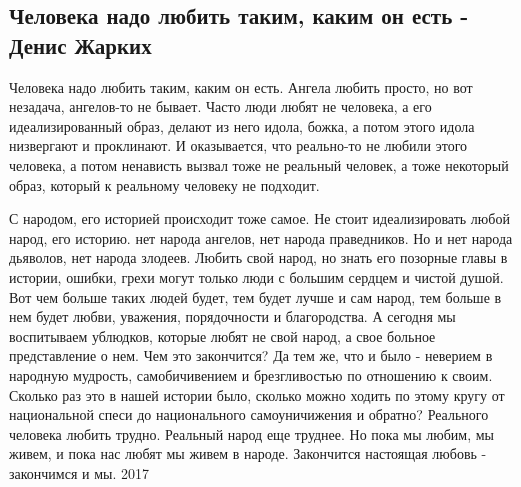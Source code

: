  
 
 

\subsection{Человека надо любить таким, каким он есть - Денис Жарких}
\label{sec:30_10_2020.fb.denis_zharkih.1.human}


Человека надо любить таким, каким он есть. Ангела любить просто, но вот
незадача, ангелов-то не бывает. Часто люди любят не человека, а его
идеализированный образ, делают из него идола, божка, а потом этого идола
низвергают и проклинают. И оказывается, что реально-то не любили этого
человека, а потом ненависть вызвал тоже не реальный человек, а тоже некоторый
образ, который к реальному человеку не подходит.

С народом, его историей происходит тоже самое. Не стоит идеализировать любой
народ, его историю. нет народа ангелов, нет народа праведников. Но и нет народа
дьяволов, нет народа злодеев. Любить свой народ, но знать его позорные главы в
истории, ошибки, грехи могут только люди с большим сердцем и чистой душой. Вот
чем больше таких людей будет, тем будет лучше и сам народ, тем больше в нем
будет любви, уважения, порядочности и благородства. А сегодня мы воспитываем
ублюдков, которые любят не свой народ, а свое больное представление о нем. Чем
это закончится? Да тем же, что и было - неверием в народную мудрость,
самобичивением и брезгливостью по отношению к своим. Сколько раз это в нашей
истории было, сколько можно ходить по этому кругу от национальной спеси до
национального самоуничижения и обратно? Реального человека любить трудно.
Реальный народ еще труднее. Но пока мы любим, мы живем, и пока нас любят мы
живем в народе. Закончится настоящая любовь - закончимся и мы.  2017
